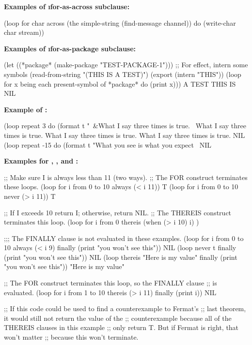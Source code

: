 {\bf Examples of \i{for-as-across} subclause:}


\code
 (loop for char across (the simple-string (find-message channel))
       do (write-char char stream))
\endcode
 
{\bf Examples of \i{for-as-package} subclause:}

\code
 (let ((*package* (make-package "TEST-PACKAGE-1")))
   ;; For effect, intern some symbols
   (read-from-string "(THIS IS A TEST)")
   (export (intern "THIS"))
   (loop for x being each present-symbol of *package*
          do (print x)))
\OUT A 
\OUT TEST 
\OUT THIS
\OUT IS 
\EV NIL
\endcode
{}

{\bf Example of :}
 
\code
 (loop repeat 3
       do (format t "~&What I say three times is true.~%
\OUT What I say three times is true.
\OUT What I say three times is true.
\OUT What I say three times is true.
\EV NIL
 (loop repeat -15
   do (format t "What you see is what you expect~%
\EV NIL
\endcode
 
{\bf Examples for , , and :}

\code
;; Make sure I is always less than 11 (two ways).
;; The FOR construct terminates these loops.
 (loop for i from 0 to 10
       always (< i 11))
\EV T
 (loop for i from 0 to 10
       never (> i 11))
\EV T
 
;; If I exceeds 10 return I; otherwise, return NIL.
;; The THEREIS construct terminates this loop.
 (loop for i from 0
       thereis (when (> i 10) i) )

;;; The FINALLY clause is not evaluated in these examples.
 (loop for i from 0 to 10
       always (< i 9)
       finally (print "you won't see this"))
\EV NIL
 (loop never t
       finally (print "you won't see this"))
\EV NIL
 (loop thereis "Here is my value"
       finally (print "you won't see this"))
\EV "Here is my value"
 
;; The FOR construct terminates this loop, so the FINALLY clause 
;; is evaluated.
 (loop for i from 1 to 10
       thereis (> i 11)
       finally (print i))
\EV NIL
 
;; If this code could be used to find a counterexample to Fermat's
;; last theorem, it would still not return the value of the
;; counterexample because all of the THEREIS clauses in this example
;; only return T.  But if Fermat is right, that won't matter
;; because this won't terminate.
 
